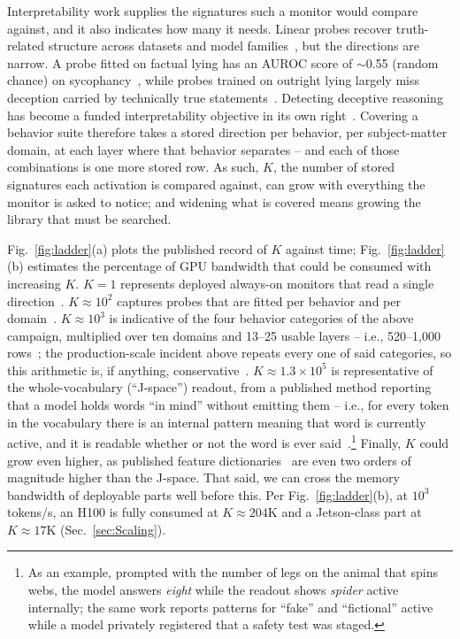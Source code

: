 \documentclass[conference]{IEEEtran}
\newcommand{\auroc}{{AUROC}\xspace}
\begin{document}
Interpretability work supplies the signatures such a monitor would
compare against, and it also indicates how many it needs. Linear
probes recover truth-related structure across datasets and model
families~\cite{marks2023geometry,burns2023ccs,zou2023repe}, but the
directions are narrow. A probe fitted on factual lying has an
\auroc score of $\sim$0.55 (random chance) on
sycophancy~\cite{ying2026spectrum}, while probes trained on outright
lying largely miss deception carried by technically true
statements~\cite{berger2026liedetector}. Detecting deceptive
reasoning has become a funded interpretability objective in its own
right~\cite{schmidt2026interp}. Covering a behavior suite therefore
takes a stored direction per behavior, per subject-matter domain, at
each layer where that behavior separates -- and each of those
combinations is one more stored row. As such, $K$, the number of
stored signatures each activation is compared against, can grow with
everything the monitor is asked to notice; and widening what is
covered means growing the library that must be searched.

Fig.~\ref{fig:ladder}(a) plots the published record of $K$ against
time; Fig.~\ref{fig:ladder}(b) estimates the percentage of GPU
bandwidth that could be consumed with increasing $K$.
\textbf{\boldmath$K=1$} represents deployed always-on monitors that
read a single direction~\cite{ccpp2026,gemini2026probes}.
\textbf{\boldmath$K\approx10^{2}$} captures probes that are fitted per
behavior and per domain~\cite{ying2026spectrum}.
\textbf{\boldmath$K\approx10^{3}$} is indicative of the four behavior
categories of the above campaign, multiplied over ten domains and
13--25 usable layers -- i.e., 520--1{,}000
rows~\cite{aisi2026incident}; the production-scale incident above
repeats every one of said categories, so this arithmetic is, if
anything, conservative~\cite{clark2026import}.
\textbf{\boldmath$K\approx1.3\!\times\!10^{5}$} is representative of
the whole-vocabulary (``J-space'') readout, from a published method
reporting that a model holds words ``in mind'' without emitting them
-- i.e., for every token in the vocabulary there is an internal
pattern meaning that word is currently active, and it is readable
whether or not the word is ever
said~\cite{anthropic2026workspace}.\footnote{As an example, prompted
with the number of legs on the animal that spins webs, the model
answers \emph{eight} while the readout shows \emph{spider} active
internally; the same work reports patterns for ``fake'' and
``fictional'' active while a model privately registered that a safety
test was staged.} Finally, $K$ could grow even
higher, as published feature
dictionaries~\cite{templeton2024scaling,gao2024sae,lieberum2024gemmascope}
are even two orders of magnitude higher than the J-space. That said,
we can cross the memory bandwidth of deployable parts well before this.
Per Fig.~\ref{fig:ladder}(b), at $10^{3}$ tokens/s, an H100 is fully
consumed at $K\!\approx\!204$K and a Jetson-class part at
$K\!\approx\!17$K (Sec.~\ref{sec:Scaling}).
\end{document}
